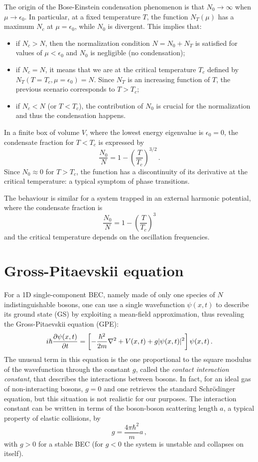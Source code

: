 The origin of the Bose-Einstein condensation phenomenon is that $N_0 \to \infty$ when $\mu \to \epsilon_0$. In particular, at a fixed temperature $T$, the function $N_T(\mu)$ has a maximum $N_c$ at $\mu = \epsilon_0$, while $N_0$ is divergent. This implies that:
\begin{itemize}
    \item if $N_c > N$, then the normalization condition $N = N_0 + N_T$ is satisfied for values of $\mu < \epsilon_0$ and $N_0$ is negligible (no condensation);
    \item if $N_c = N$, it means that we are at the critical temperature $T_c$ defined by $N_T(T = T_c, \mu = \epsilon_0) = N$. Since $N_T$ is an increasing function of $T$, the previous scenario corresponds to $T > T_c$;
    \item if $N_c < N$ (or $T < T_c$), the contribution of $N_0$ is crucial for the normalization and thus the condensation happens.
\end{itemize}
In a finite box of volume $V$, where the lowest energy eigenvalue is $\epsilon_0 = 0$, the condensate fraction for $T < T_c$ is expressed by
\begin{equation*}
    \frac{N_0}{N} = 1-\left(\frac{T}{T_c}\right)^{3/2}\, .
\end{equation*}
Since $N_0 \approx 0$ for $T > T_c$, the function has a discontinuity of its derivative at the critical temperature: a typical symptom of phase transitions.

The behaviour is similar for a system trapped in an external harmonic potential, where the condensate fraction is
\begin{equation*}
    \frac{N_0}{N} = 1-\left(\frac{T}{T_c}\right)^3
\end{equation*}
and the critical temperature depends on the oscillation frequencies.

\section{Gross-Pitaevskii equation}
For a 1D single-component BEC, namely made of only one species of $N$ indistinguishable bosons, one can use a single wavefunction $\psi(x,t)$ to describe its ground state (GS) by exploiting a mean-field approximation, thus revealing the Gross-Pitaevskii equation (GPE):
\begin{equation}
    i\hbar \pdv{\psi(x,t)}{t} = \left[ 
        -\frac{\hbar^2}{2m}\nabla^2 + V(x,t) + g|\psi(x,t)|^2
    \right] \psi(x,t)\, .
\end{equation}
The unusual term in this equation is the one proportional to the square modulus of the wavefunction through the constant $g$, called the \textit{contact interaction constant}, that describes the interactions between bosons. In fact, for an ideal gas of non-interacting bosons, $g = 0$ and one retrieves the standard Schrödinger equation, but this situation is not realistic for our purposes. The interaction constant can be written in terms of the boson-boson scattering length $a$, a typical property of elastic collisions, by
\[
    g = \frac{4\pi\hbar^2}{m}a\, ,
\]
with $g > 0$ for a stable BEC (for $g < 0$ the system is unstable and collapses on itself).

